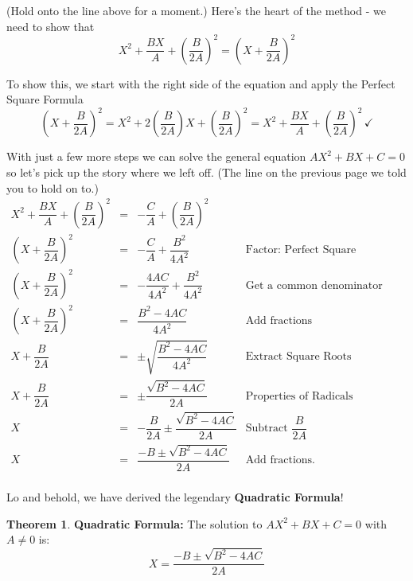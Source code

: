 \documentclass[11pt]{article}
\theoremstyle{definition}  %
\newtheorem{thm}{\bf Theorem}
\newcommand{\bbm}{\begin{boxedminipage}{6.41in}}
\newcommand{\ebm}{\end{boxedminipage}}
\begin{document}
(Hold onto the line above for a moment.)  Here's the heart of the method - we need to show that \[ X^2 + \dfrac{BX}{A} + \left(\dfrac{B}{2A}\right)^2 = \left(X + \dfrac{B}{2A}\right)^2 \]

To show this, we start with the right side of the equation and apply the Perfect Square Formula  \[ \left(X + \dfrac{B}{2A}\right)^2 = X^2 + 2\left(\dfrac{B}{2A}\right)X + \left(\dfrac{B}{2A}\right)^2 = X^2 + \dfrac{BX}{A} + \left(\dfrac{B}{2A}\right)^2 \, \checkmark \]

With just a few more steps we can solve the general equation $AX^{2} + BX + C = 0$ so let's pick up the story where we left off. (The line on the previous page we told you to hold on to.)\[ \begin{array}{rclr}

X^2 + \dfrac{BX}{A} + \left(\dfrac{B}{2A}\right)^2 & = & -\dfrac{C}{A} + \left(\dfrac{B}{2A}\right)^2 & \\ [8pt]
\left(X + \dfrac{B}{2A}\right)^2 & = & -\dfrac{C}{A} + \dfrac{B^2}{4A^2} & \text{Factor: Perfect Square Trinomial} \\ [3pt]

\left(X + \dfrac{B}{2A}\right)^2 & = & -\dfrac{4AC}{4A^2} + \dfrac{B^2}{4A^2} & \text{Get a common denominator}\\

\left(X + \dfrac{B}{2A}\right)^2 & = & \dfrac{B^2 - 4AC}{4A^2} & \text{Add fractions}\\ [5pt]

X + \dfrac{B}{2A} & = & \pm \sqrt{\dfrac{B^2 - 4AC}{4A^2}} & \text{Extract Square Roots} \\ [8pt]

X + \dfrac{B}{2A} & = & \pm \dfrac{\sqrt{B^2 - 4AC}}{2A} & \text{Properties of Radicals} \\ [8pt]

X  & = & - \dfrac{B}{2A} \pm \dfrac{\sqrt{B^2 - 4AC}}{2A} & \text{Subtract $\dfrac{B}{2A}$} \\ [8pt]

X  & = & \dfrac{-B \pm \sqrt{B^2 - 4AC}}{2A} & \text{Add fractions.} \\

\end{array}\]

Lo and behold, we have derived the legendary \textbf{Quadratic Formula}!

\medskip

\colorbox{ResultColor}{\bbm

\begin{thm}\label{quadraticformula}  \textbf{Quadratic Formula:} The solution to $AX^2 + BX + C = 0$ with $A \neq 0$ is: \[X  = \dfrac{-B \pm \sqrt{B^2 - 4AC}}{2A} \]

\end{thm}

\ebm}
\end{document}
